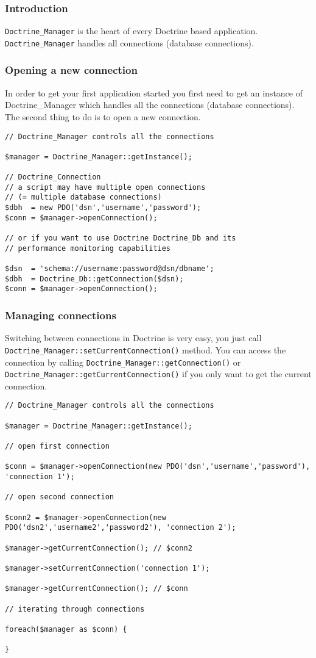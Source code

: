 \documentclass[11pt,a4paper]{report}
\begin{document}
\subsubsection{Introduction}
\texttt{Doctrine\_Manager} is the heart of every Doctrine based application. \texttt{Doctrine\_Manager} handles all connections (database connections).

\subsubsection{Opening a new connection}
In order to get your first application started you first need to get an instance of Doctrine\_Manager which handles all the connections (database connections). The second thing to do is to open a new connection.

\begin{verbatim}
// Doctrine_Manager controls all the connections

$manager = Doctrine_Manager::getInstance();

// Doctrine_Connection
// a script may have multiple open connections
// (= multiple database connections)
$dbh  = new PDO('dsn','username','password');
$conn = $manager->openConnection();

// or if you want to use Doctrine Doctrine_Db and its
// performance monitoring capabilities

$dsn  = 'schema://username:password@dsn/dbname';
$dbh  = Doctrine_Db::getConnection($dsn);
$conn = $manager->openConnection();
\end{verbatim}

\subsubsection{Managing connections}
Switching between connections in Doctrine is very easy, you just call \texttt{Doctrine\_Manager::setCurrentConnection()} method. You can access the connection by calling \texttt{Doctrine\_Manager::getConnection()} or \texttt{Doctrine\_Manager::getCurrentConnection()} if you only want to get the current connection.

\begin{verbatim}
// Doctrine_Manager controls all the connections

$manager = Doctrine_Manager::getInstance();

// open first connection

$conn = $manager->openConnection(new PDO('dsn','username','password'), 'connection 1');

// open second connection

$conn2 = $manager->openConnection(new PDO('dsn2','username2','password2'), 'connection 2');

$manager->getCurrentConnection(); // $conn2

$manager->setCurrentConnection('connection 1');

$manager->getCurrentConnection(); // $conn

// iterating through connections

foreach($manager as $conn) {

}
\end{verbatim}
\end{document}
